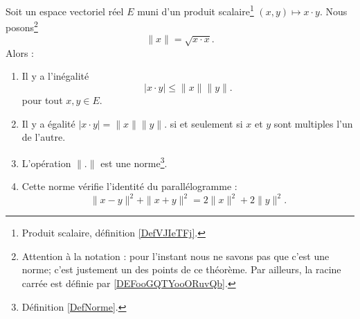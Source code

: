 \begin{theorem}      \label{ThoAYfEHG}
	Soit un espace vectoriel réel \( E\) muni d'un produit scalaire\footnote{Produit scalaire, définition \ref{DefVJIeTFj}.} \( (x,y)\mapsto x\cdot y\). Nous posons\footnote{Attention à la notation : pour l'instant nous ne savons pas que c'est une norme; c'est justement un des points de ce théorème. Par ailleurs, la racine carrée est définie par \ref{DEFooGQTYooORuvQb}.}
	\begin{equation}
		\| x \|=\sqrt{ x\cdot x }.
	\end{equation}
	Alors :
	\begin{enumerate}
		\item
		      Il y a l'inégalité
		      \begin{equation}        \label{EQooZDSHooWPcryG}
			      | x\cdot y |\leq \| x \|\| y \|.
		      \end{equation}
		      pour tout \( x,y\in E\).
		\item
		      Il y a égalité \( | x\cdot y | = \| x \|\| y \|.\) si et seulement si \( x\) et \( y\) sont multiples l'un de l'autre.
		\item
		      L'opération \( \| . \|\) est une norme\footnote{Définition \ref{DefNorme}.}.
		\item
		      Cette norme vérifie l'identité du parallélogramme :
		      \begin{equation}        \label{EqYCLtWfJ}
			      \| x-y \|^2+\| x+y \|^2=2\| x \|^2+2\| y \|^2.
		      \end{equation}
	\end{enumerate}
\end{theorem}


